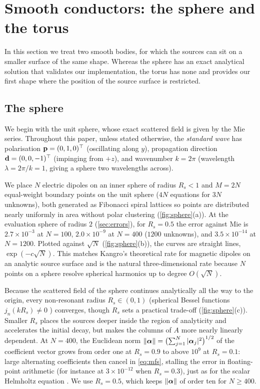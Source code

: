 \section{Smooth conductors: the sphere and the torus}
\label{sec:smooth}

In this section we treat two smooth bodies, for which the sources can sit on a smaller surface of the same shape. Whereas the sphere has an exact analytical solution that validates our implementation, the torus has none and provides our first shape where the position of the source surface is restricted.

\subsection{The sphere}

We begin with the unit sphere, whose exact scattered field is given by the Mie series. Throughout this paper, unless stated otherwise, the \emph{standard wave} has polarisation $\mathbf{p} = (0,1,0)^\top$ (oscillating along $y$), propagation direction $\mathbf{d} = (0,0,-1)^\top$ (impinging from $+z$), and wavenumber $k = 2\pi$ (wavelength $\lambda = 2\pi/k = 1$, giving a sphere two wavelengths across).

We place $N$ electric dipoles on an inner sphere of radius $R_s<1$ and $M = 2N$ equal-weight boundary points on the unit sphere ($4N$ equations for $3N$ unknowns), both generated as Fibonacci spiral lattices so points are distributed nearly uniformly in area without polar clustering (\autoref{fig:sphere}(a)). At the evaluation sphere of radius $2$ (\autoref{sec:errors}), for $R_s = 0.5$ the error against Mie is $2.7\times10^{-3}$ at $N = 100$, $2.0\times10^{-9}$ at $N = 400$ ($1200$ unknowns), and $3.5\times10^{-14}$ at $N = 1200$. Plotted against $\sqrt{N}$ (\autoref{fig:sphere}(b)), the curves are straight lines, $\exp(-c\sqrt{N})$. This matches Kangro's theoretical rate for magnetic dipoles on an analytic source surface \cite{kangro2012} and is the natural three-dimensional rate because $N$ points on a sphere resolve spherical harmonics up to degree $O(\sqrt{N})$.

Because the scattered field of the sphere continues analytically all the way to the origin, every non-resonant radius $R_s\in(0,1)$ (spherical Bessel functions $j_n(kR_s)\ne0$ \cite{colton2013}) converges, though $R_s$ sets a practical trade-off (\autoref{fig:sphere}(c)). Smaller $R_s$ places the sources deeper inside the region of analyticity and accelerates the initial decay, but makes the columns of $A$ more nearly linearly dependent. At $N = 400$, the Euclidean norm $\|\boldsymbol{\alpha}\| = \bigl(\sum_{j=1}^N |\boldsymbol{\alpha}_j|^2\bigr)^{1/2}$ of the coefficient vector grows from order one at $R_s = 0.9$ to above $10^{9}$ at $R_s = 0.1$: large alternating coefficients then cancel in \eqref{eq:mfs}, stalling the error in floating-point arithmetic (for instance at $3\times10^{-12}$ when $R_s = 0.3$), just as for the scalar Helmholtz equation \cite{barnett2008,thesis2025}. We use $R_s = 0.5$, which keeps $\|\boldsymbol{\alpha}\|$ of order ten for $N\ge400$.

